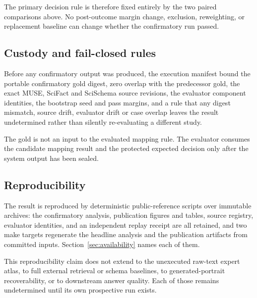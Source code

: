 The primary decision rule is therefore fixed entirely by the two paired
comparisons above. No post-outcome margin change, exclusion, reweighting, or
replacement baseline can change whether the confirmatory run passed.

\subsection{Custody and fail-closed rules}

Before any confirmatory output was produced, the execution manifest bound the
portable confirmatory gold digest, zero overlap with the predecessor gold, the
exact MUSE, SciFact and SciSchema source revisions, the evaluator component
identities, the bootstrap seed and pass margins, and a rule that any digest
mismatch, source drift, evaluator drift or case overlap leaves the result
undetermined rather than silently re-evaluating a different study.

The gold is not an input to the evaluated mapping rule. The evaluator consumes
the candidate mapping result and the protected expected decision only after
the system output has been sealed.

\subsection{Reproducibility}

The result is reproduced by deterministic public-reference scripts over
immutable archives: the confirmatory analysis, publication figures and tables,
source registry, evaluator identities, and an independent replay receipt are
all retained, and two make targets regenerate the headline analysis and the
publication artifacts from committed inputs. Section~\ref{sec:availability}
names each of them.

This reproducibility claim does not extend to the unexecuted raw-text expert
atlas, to full external retrieval or schema baselines, to generated-portrait
recoverability, or to downstream answer quality. Each of those remains
undetermined until its own prospective run exists.

\endinput
